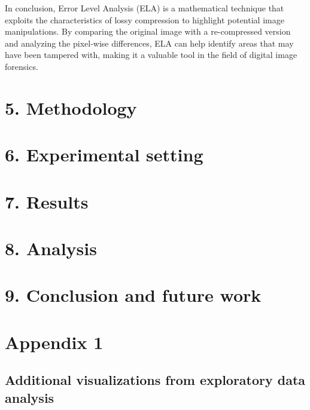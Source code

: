 \documentclass[
  11pt,
]{article}
\begin{document}
In conclusion, Error Level Analysis (ELA) is a mathematical technique
that exploits the characteristics of lossy compression to highlight
potential image manipulations. By comparing the original image with a
re-compressed version and analyzing the pixel-wise differences, ELA can
help identify areas that may have been tampered with, making it a
valuable tool in the field of digital image forensics.

\pagebreak

\hypertarget{methodology}{%
\section{5. Methodology}\label{methodology}}

\pagebreak

\hypertarget{experimental-setting}{%
\section{6. Experimental setting}\label{experimental-setting}}

\pagebreak

\hypertarget{results}{%
\section{7. Results}\label{results}}

\pagebreak

\hypertarget{analysis}{%
\section{8. Analysis}\label{analysis}}

\pagebreak

\hypertarget{conclusion-and-future-work}{%
\section{9. Conclusion and future
work}\label{conclusion-and-future-work}}

\pagebreak

\hypertarget{appendix-1}{%
\section{Appendix 1}\label{appendix-1}}

\hypertarget{additional-visualizations-from-exploratory-data-analysis}{%
\subsection{Additional visualizations from exploratory data
analysis}\label{additional-visualizations-from-exploratory-data-analysis}}
\end{document}
